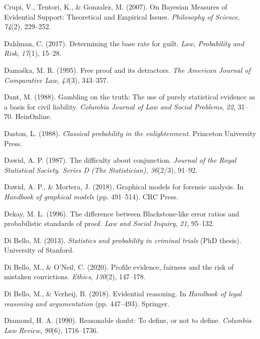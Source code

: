 \documentclass[11pt,dvipsnames,enabledeprecatedfontcommands]{scrartcl}
\begin{document}
\hypertarget{ref-crupi2007BayesianMeasuresEvidential}{}
Crupi, V., Tentori, K., \& Gonzalez, M. (2007). On Bayesian Measures of
Evidential Support: Theoretical and Empirical Issues. \emph{Philosophy
of Science}, \emph{74}(2), 229--252.

\hypertarget{ref-dahlman2017}{}
Dahlman, C. (2017). Determining the base rate for guilt. \emph{Law,
Probability and Risk}, \emph{17}(1), 15--28.

\hypertarget{ref-damaska1996free}{}
Damaška, M. R. (1995). Free proof and its detractors. \emph{The American
Journal of Comparative Law}, \emph{43}(3), 343--357.

\hypertarget{ref-dant1988gambling}{}
Dant, M. (1988). Gambling on the truth: The use of purely statistical
evidence as a basis for civil liability. \emph{Columbia Journal of Law
and Social Problems}, \emph{22}, 31--70. HeinOnline.

\hypertarget{ref-daston1988}{}
Daston, L. (1988). \emph{Classical probability in the enlightenment}.
Princeton University Press.

\hypertarget{ref-dawid1987}{}
Dawid, A. P. (1987). The difficulty about conjunction. \emph{Journal of
the Royal Statistical Society. Series D (The Statistician),}
\emph{36}(2/3), 91--92.

\hypertarget{ref-dawid2018graphical}{}
Dawid, A. P., \& Mortera, J. (2018). Graphical models for forensic
analysis. In \emph{Handbook of graphical models} (pp. 491--514). CRC
Press.

\hypertarget{ref-Dekay1996}{}
Dekay, M. L. (1996). The difference between Blackstone-like error ratios
and probabilistic standards of proof. \emph{Law and Social Inquiry},
\emph{21}, 95--132.

\hypertarget{ref-di2013statistics}{}
Di Bello, M. (2013). \emph{Statistics and probability in criminal
trials} (PhD thesis). University of Stanford.

\hypertarget{ref-DiBelloONeil2020}{}
Di Bello, M., \& O'Neil, C. (2020). Profile evidence, fairness and the
risk of mistaken convictions. \emph{Ethics}, \emph{130}(2), 147--178.

\hypertarget{ref-di2018evidential}{}
Di Bello, M., \& Verheij, B. (2018). Evidential reasoning. In
\emph{Handbook of legal reasoning and argumentation} (pp. 447--493).
Springer.

\hypertarget{ref-diamond90}{}
Diamond, H. A. (1990). Reasonable doubt: To define, or not to define.
\emph{Columbia Law Review}, \emph{90}(6), 1716--1736.
\end{document}
